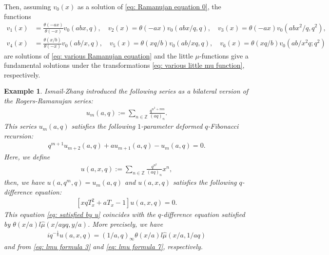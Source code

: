 \documentclass[a4paper]{article}
\newcommand{\Zz}{\mathbb{Z}}
\numberwithin{equation}{section}
\theoremstyle{plain}
\newtheorem{exg}{Example}
\begin{document}
\begin{appendices}
Then, assuming $v_0(x)$ as a solution of \eqref{eq: Ramanujan equation 0}, the functions 
\begin{align}
  v_1(x)&=\frac{\theta(-ax)}{\theta(-x)}v_0(abx,q)
  ,\quad 
  v_2(x)=\theta(-ax)v_0(abx/q,q), 
  \quad 
  v_3(x)=\theta(-ax)v_0(ab x^2/q,q^2), 
  \nonumber \\
  \label{eq: various little mu function}
  v_4(x)&=\frac{\theta(x/b)}{\theta(-x)}v_0(ab/x,q), 
  \quad 
  v_5(x)=\theta(xq/b)v_0(ab/xq,q), 
  \quad 
  v_6(x)=\theta(xq/b)v_0(ab/x^2q;q^2)
\end{align}
are solutions of \eqref{eq: various Ramanujan equation} and the little $\mu$-functions give a fundamental solutions under the transformations \eqref{eq: various little mu function}, respectively. 
\begin{exg}
Ismail-Zhang \cite{IZ} introduced the following series as a bilateral version of the Rogers-Ramanujan series: 
\begin{align*}
u_m(a,q):=\sum_{n\in\Zz}\frac{q^{n^2+mn}}{(aq)_n}. 
\end{align*}
This series $u_m(a,q)$ satisfies the following $1$-parameter deformed $q$-Fibonacci recursion: 
\begin{align}
\label{eq: a-Fibonacci}
q^{m+1}u_{m+2}(a,q)+a u_{m+1}(a,q)-u_m(a,q)=0. 
\end{align}
Here, we define 
\begin{align*}
u(a,x,q):=\sum_{n\in\Zz}\frac{q^{n^2}}{(aq)_n}x^n, 
\end{align*}
then, we have $u(a,q^m,q)=u_m(a,q)$ and $u(a,x,q)$ satisfies the following $q$-difference equation: 
\begin{align}
\label{eq: satisfied by u}
[xq T_x^2+a T_x-1]u(a,x,q)=0. 
\end{align}
This equation \eqref{eq: satisfied by u} coincides with the $q$-difference equation satisfied by $\theta(x/a)l\widehat{\mu}(x/ayq,y/a)$. 
More precisely, we have 
\begin{align*}
iq^{-\frac{1}{8}}u(a,x,q)=(1/a,q)_\infty\theta(x/a)l\widehat{\mu}(x/a,1/aq) 
\end{align*}
and \cite[Theorem 3.3]{IZ} from \eqref{eq: lmu formula 3} and \eqref{eq: lmu formula 7}, respectively.
\end{exg}
\end{appendices}
\end{document}

